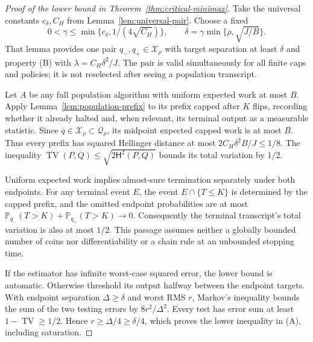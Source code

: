 \documentclass[11pt]{article}
\newcommand{\Pp}{\mathbb P}
\newcommand{\Hsq}{\mathsf H^2}
\newcommand{\Xrho}{\mathcal X_\rho}
\begin{document}
\begin{proof}[Proof of the lower bound in Theorem~\ref{thm:critical-minimax}]
Take the universal constants $c_\delta,C_H$ from
Lemma~\ref{lem:universal-pair}. Choose a fixed
\[
 0<\gamma\le\min\{c_\delta,1/(4\sqrt{C_H})\},
 \qquad \delta=\gamma\min\{\rho,\sqrt{J/B}\}.
\]
That lemma provides one pair $q_-,q_+\in\Xrho$ with target separation at
least $\delta$ and property (B) with $\lambda=C_H\delta^2/J$.
The pair is valid simultaneously for all finite caps and policies; it is
not reselected after seeing a population transcript.

Let $A$ be any full population algorithm with uniform expected work at most
$B$. Apply Lemma~\ref{lem:population-prefix} to its prefix capped after
$K$ flips, recording whether it already halted and, when relevant, its
terminal output as a measurable statistic. Since $\bar q\in\Xrho\subset
\mathcal Q_\rho$, its midpoint expected capped work is at most $B$.
Thus every prefix has squared Hellinger distance at most
$2C_H\delta^2B/J\le1/8$. The inequality
$\operatorname{TV}(P,Q)\le\sqrt{2\Hsq(P,Q)}$ bounds its total variation
by $1/2$.

Uniform expected work implies almost-sure termination separately under both
endpoints. For any terminal event $E$, the event $E\cap\{T\le K\}$ is
determined by the capped prefix, and the omitted endpoint probabilities
are at most $\Pp_{q_-}(T>K)+\Pp_{q_+}(T>K)\to0$.
Consequently the terminal transcript's total variation is also at most
$1/2$. This passage assumes neither a globally bounded number of coins
nor differentiability or a chain rule at an unbounded stopping time.

If the estimator has infinite worst-case squared error, the lower bound is
automatic. Otherwise threshold its output halfway between the endpoint
targets. With endpoint separation $\Delta\ge\delta$ and worst RMS $r$,
Markov's inequality bounds the sum of the two testing errors by
$8r^2/\Delta^2$. Every test has error sum at least
$1-\operatorname{TV}\ge1/2$. Hence $r\ge\Delta/4\ge\delta/4$,
which proves the lower inequality in (A), including saturation.
\end{proof}
\end{document}
